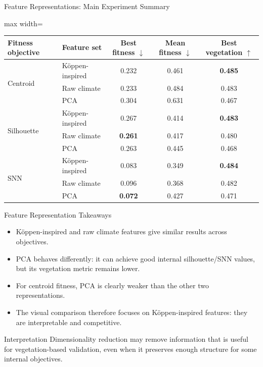 \documentclass[aspectratio=169,10pt]{beamer}
\newcommand{\betterdown}{\(\downarrow\)}
\newcommand{\betterup}{\(\uparrow\)}
\begin{document}
\begin{frame}{Feature Representations: Main Experiment Summary}
  \begin{adjustbox}{max width=\textwidth}
  \begin{tabular}{llccc}
    \toprule
    Fitness objective & Feature set & Best fitness \betterdown & Mean fitness \betterdown & Best vegetation \betterup \\
    \midrule
    \multirow{3}{*}{Centroid}
      & K\"oppen-inspired & 0.232 & 0.461 & \textbf{0.485} \\
      & Raw climate & 0.233 & 0.484 & 0.483 \\
      & PCA & 0.304 & 0.631 & 0.467 \\
    \midrule
    \multirow{3}{*}{Silhouette}
      & K\"oppen-inspired & 0.267 & 0.414 & \textbf{0.483} \\
      & Raw climate & \textbf{0.261} & 0.417 & 0.480 \\
      & PCA & 0.263 & 0.445 & 0.468 \\
    \midrule
    \multirow{3}{*}{SNN}
      & K\"oppen-inspired & 0.083 & 0.349 & \textbf{0.484} \\
      & Raw climate & 0.096 & 0.368 & 0.482 \\
      & PCA & \textbf{0.072} & 0.427 & 0.471 \\
    \bottomrule
  \end{tabular}
  \end{adjustbox}
\end{frame}

\begin{frame}{Feature Representation Takeaways}
  \begin{itemize}
    \item K\"oppen-inspired and raw climate features give similar results across objectives.
    \item PCA behaves differently: it can achieve good internal silhouette/SNN values, but its vegetation metric remains lower.
    \item For centroid fitness, PCA is clearly weaker than the other two representations.
    \item The visual comparison therefore focuses on K\"oppen-inspired features: they are interpretable and competitive.
  \end{itemize}

  \vspace{1em}
  \begin{block}{Interpretation}
    Dimensionality reduction may remove information that is useful for vegetation-based validation, even when it preserves enough structure for some internal objectives.
  \end{block}
\end{frame}
\end{document}
